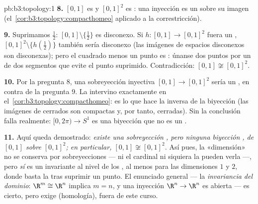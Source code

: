\begin{solution}{pb:b3:topology:1}
\textbf{8.} $[0,1]$ es  y
$[0,1]^2$ es : una
inyección  es un
 sobre su imagen
(el~\cref{cor:b3:topology:compacthomeo} aplicado a la correstricción).

\textbf{9.} Suprimamos $\frac12$: $[0,1]\setminus\{\frac12\}$ es
disconexo. Si $h \colon [0,1] \to [0,1]^2$ fuera un
,
$[0,1]^2\setminus\{h(\frac12)\}$ también sería disconexo (las imágenes
 de espacios disconexos
son disconexas); pero el cuadrado menos un punto es
: únanse dos
puntos por un  de dos
segmentos que evite el punto suprimido. Contradicción:
$[0,1] \not\cong [0,1]^2$.

\textbf{10.} Por la pregunta 8, una sobreyección
 inyectiva
$[0,1] \to [0,1]^2$ sería un
, en contra de la
pregunta 9. La  intervino exactamente en
el~\cref{cor:b3:topology:compacthomeo}: es lo que hace
 la inversa de la biyección
 (las imágenes de cerrados
son compactas y, por tanto, cerradas).
Sin  la conclusión falla realmente: $[0, 2\pi) \to S^1$ es una
biyección  que no es un
.

\textbf{11.} Aquí queda demostrado: \emph{existe una sobreyección
, pero ninguna biyección
, de $[0,1]$ sobre
$[0,1]^2$; en particular, $[0,1] \not\cong [0,1]^2$.} Así pues, la
«dimensión» no se conserva por sobreyecciones
 --- ni el cardinal ni
siquiera la  pueden
verla ---, pero \emph{sí} es un invariante
 al nivel de los
, al menos para las
dimensiones $1$ y $2$, donde basta la  tras suprimir un punto.
El enunciado general --- la \emph{invariancia del dominio}:
$\R^m \cong \R^n$ implica $m =
n$, y una inyección 
$\R^n \to \R^n$ es abierta --- es cierto, pero exige
 (homología), fuera de este
curso.


\end{solution}
